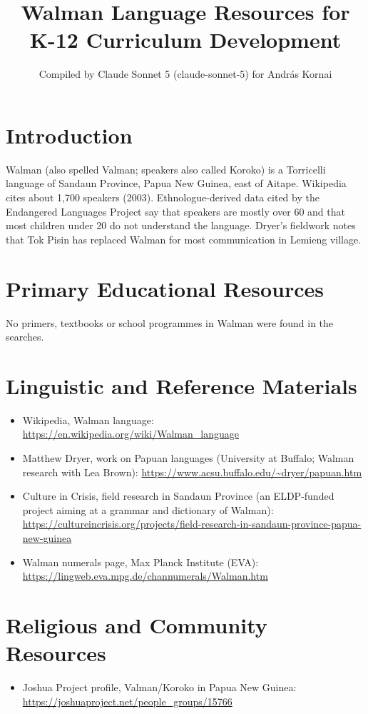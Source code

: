 \documentclass[12pt]{article}
\title{Walman Language Resources for K-12 Curriculum Development}
\author{Compiled by Claude Sonnet 5 (claude-sonnet-5) for Andr\'as Kornai}
\date{}
\begin{document}
\maketitle

\section{Introduction}
Walman (also spelled Valman; speakers also called Koroko) is a Torricelli language of Sandaun Province, Papua New Guinea, east of Aitape. Wikipedia cites about 1,700 speakers (2003). Ethnologue-derived data cited by the Endangered Languages Project say that speakers are mostly over 60 and that most children under 20 do not understand the language. Dryer's fieldwork notes that Tok Pisin has replaced Walman for most communication in Lemieng village.

\section{Primary Educational Resources}
No primers, textbooks or school programmes in Walman were found in the searches.

\section{Linguistic and Reference Materials}
\begin{itemize}
\item Wikipedia, Walman language: \url{https://en.wikipedia.org/wiki/Walman_language}
\item Matthew Dryer, work on Papuan languages (University at Buffalo; Walman research with Lea Brown): \url{https://www.acsu.buffalo.edu/~dryer/papuan.htm}
\item Culture in Crisis, field research in Sandaun Province (an ELDP-funded project aiming at a grammar and dictionary of Walman): \url{https://cultureincrisis.org/projects/field-research-in-sandaun-province-papua-new-guinea}
\item Walman numerals page, Max Planck Institute (EVA): \url{https://lingweb.eva.mpg.de/channumerals/Walman.htm}
\end{itemize}

\section{Religious and Community Resources}
\begin{itemize}
\item Joshua Project profile, Valman/Koroko in Papua New Guinea: \url{https://joshuaproject.net/people_groups/15766}
\end{itemize}
\end{document}
